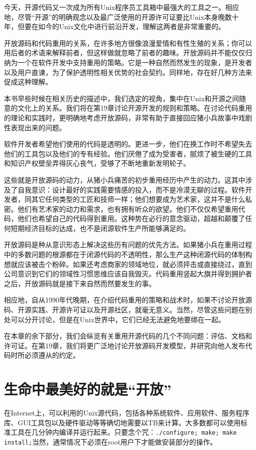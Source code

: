 \documentclass[12pt,oneside]{ctexbook}
\begin{document}
\begin{common-format}
今天，开源代码又一次成为所有Unix程序员工具箱中最强大的工具之一。相应地，尽管“开源”的明确观念以及最广泛使用的开源许可证要比Unix本身晚数十年，但要在如今的Unix文化中进行前沿开发，理解这两者是非常重要的。

开放源码和代码重用的关系，在许多地方很像浪漫爱情和有性生殖的关系；你可以用后者的术语来解释前者，但这样做就忽略了前者的趣味。开放源码并不能仅仅归纳为一个在软件开发中支持重用的策略。它是一种自然而然发生的现象，是开发者以及用户直谏，为了保护透明性相关优势的社会契约。同样地，存在好几种方法来促成这种理解。

本书早些时候在相关历史的描述中，我们选定的视角，集中在Unix和开源之间随意的文化上的关系。我们将在第19章讨论开源开发的规则和策略。在讨论代码重用的理论和实践时，更明确地考虑开放源码，非常有助于直接回应猪小兵故事中戏剧性表现出来的问题。

软件开发者希望他们使用的代码是透明的。更进一步，他们在换工作时不希望失去他们的工具包以及他们的专有经验。他们厌倦了成为受害者，腻烦了被生硬的工具和知识产权壁垒弄得灰心丧气，受够了不断地重新发明轮子。

这些就是开放源码的动力，从猪小兵痛苦的初步重用经历中产生的动力。这其中涉及了自我意识：设计最好的实践需要情感的投入，而不是冷漠无聊的过程。软件开发者，同其它任何类型的工匠和技师一样；他们想要成为艺术家，这并不是什么私密。他们有艺术家的动力和需求，也有拥有听众的欲望。他们不仅仅希望重用代码，他们也希望自己的代码得到重用。这种势在必行的意念驱动，超越和颠覆了任何短期经济目标的达成，也不是闭源软件生产所能够满足的。

开放源码是种从意识形态上解决这些历有问题的优先方法。如果猪小兵在重用过程中的多数问题的根源都在于闭源代码的不透明性，那么生产这种闭源代码的体制构想就应该被击个粉碎。如果还考虑商家的领域地位，就必须抨击或直接绕过，直到公司意识到它们的领域性习惯思维应该自我毁灭。代码重用竖起大旗并得到拥护者之后，开放源码就是接下来自然而然要发生的事。

相应地，自从1990年代晚期，在介绍代码重用的策略和战术时，如果不讨论开放源码、开源实践、开源许可证以及开源社区，就毫无意义。当然，尽管这些问题在别处可以分开讨论，但是在Unix世界中，它们已经无法避免地要绑在一起。

在本章的余下部分，我们会纵览有关重用开源代码的几个不同问题：评估、文档和许可证。在第19章，我们将更广泛地讨论开放源码开发模型，并研究向他人发布代码时所必须遵从的约定。

\section{生命中最美好的就是“开放”}
在Internet上，可以利用的Unix源代码，包括各种系统软件、应用软件、服务程序库、GUI工具包以及硬件驱动等等确切地需要以TB来计算。大多数都可以使用标准工具在几分钟内编译并运行起来。只要念个咒：\verb+./configure; make; make install;+当然，通常情况下必须在root用户下才能做安装部分的操作。


\end{common-format}
\end{document}
